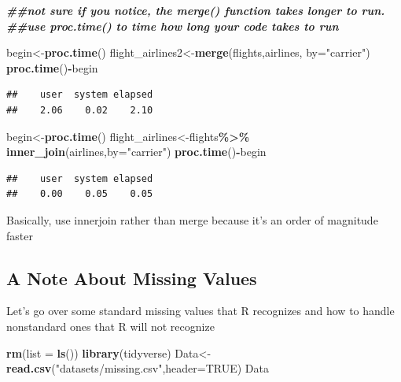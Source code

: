 \documentclass[
  openany]{book}
\newenvironment{Shaded}{\begin{snugshade}}{\end{snugshade}}
\newcommand{\AttributeTok}[1]{\textcolor[rgb]{0.13,0.29,0.53}{#1}}
\newcommand{\ConstantTok}[1]{\textcolor[rgb]{0.56,0.35,0.01}{#1}}
\newcommand{\DocumentationTok}[1]{\textcolor[rgb]{0.56,0.35,0.01}{\textbf{\textit{#1}}}}
\newcommand{\FunctionTok}[1]{\textcolor[rgb]{0.13,0.29,0.53}{\textbf{#1}}}
\newcommand{\NormalTok}[1]{#1}
\newcommand{\OtherTok}[1]{\textcolor[rgb]{0.56,0.35,0.01}{#1}}
\newcommand{\SpecialCharTok}[1]{\textcolor[rgb]{0.81,0.36,0.00}{\textbf{#1}}}
\newcommand{\StringTok}[1]{\textcolor[rgb]{0.31,0.60,0.02}{#1}}
\begin{document}
\begin{Shaded}
\begin{Highlighting}[]
\DocumentationTok{\#\#not sure if you notice, the merge() function takes longer to run. }
\DocumentationTok{\#\#use proc.time() to time how long your code takes to run}

\NormalTok{begin}\OtherTok{\textless{}{-}}\FunctionTok{proc.time}\NormalTok{()}
\NormalTok{flight\_airlines2}\OtherTok{\textless{}{-}}\FunctionTok{merge}\NormalTok{(flights,airlines, }\AttributeTok{by=}\StringTok{"carrier"}\NormalTok{)}
\FunctionTok{proc.time}\NormalTok{()}\SpecialCharTok{{-}}\NormalTok{begin}
\end{Highlighting}
\end{Shaded}

\begin{verbatim}
##    user  system elapsed 
##    2.06    0.02    2.10
\end{verbatim}

\begin{Shaded}
\begin{Highlighting}[]
\NormalTok{begin}\OtherTok{\textless{}{-}}\FunctionTok{proc.time}\NormalTok{()}
\NormalTok{flight\_airlines}\OtherTok{\textless{}{-}}\NormalTok{flights}\SpecialCharTok{\%\textgreater{}\%}
  \FunctionTok{inner\_join}\NormalTok{(airlines,}\AttributeTok{by=}\StringTok{"carrier"}\NormalTok{)}
\FunctionTok{proc.time}\NormalTok{()}\SpecialCharTok{{-}}\NormalTok{begin}
\end{Highlighting}
\end{Shaded}

\begin{verbatim}
##    user  system elapsed 
##    0.00    0.05    0.05
\end{verbatim}

Basically, use innerjoin rather than merge because it's an order of magnitude faster

\subsection{A Note About Missing Values}\label{a-note-about-missing-values}

Let's go over some standard missing values that R recognizes and how to handle nonstandard ones that R will not recognize

\begin{Shaded}
\begin{Highlighting}[]
\FunctionTok{rm}\NormalTok{(}\AttributeTok{list =} \FunctionTok{ls}\NormalTok{())}
\FunctionTok{library}\NormalTok{(tidyverse)}
\NormalTok{Data}\OtherTok{\textless{}{-}}\FunctionTok{read.csv}\NormalTok{(}\StringTok{"datasets/missing.csv"}\NormalTok{,}\AttributeTok{header=}\ConstantTok{TRUE}\NormalTok{)}
\NormalTok{Data}
\end{Highlighting}
\end{Shaded}
\end{document}
